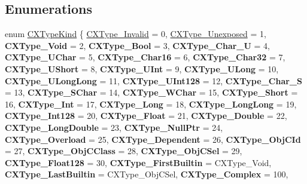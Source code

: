 \subsection*{Enumerations}
\begin{DoxyCompactItemize}
\item 
enum \hyperlink{group__CINDEX__TYPES_gaad39de597b13a18882c21860f92b095a}{C\+X\+Type\+Kind} \{ \newline
\hyperlink{group__CINDEX__TYPES_ggaad39de597b13a18882c21860f92b095aa242df2c1db62d571da24b4692781416a}{C\+X\+Type\+\_\+\+Invalid} = 0, 
\hyperlink{group__CINDEX__TYPES_ggaad39de597b13a18882c21860f92b095aa1aac64a0419dc4447e3bd63176c6a7d8}{C\+X\+Type\+\_\+\+Unexposed} = 1, 
{\bfseries C\+X\+Type\+\_\+\+Void} = 2, 
{\bfseries C\+X\+Type\+\_\+\+Bool} = 3, 
\newline
{\bfseries C\+X\+Type\+\_\+\+Char\+\_\+U} = 4, 
{\bfseries C\+X\+Type\+\_\+\+U\+Char} = 5, 
{\bfseries C\+X\+Type\+\_\+\+Char16} = 6, 
{\bfseries C\+X\+Type\+\_\+\+Char32} = 7, 
\newline
{\bfseries C\+X\+Type\+\_\+\+U\+Short} = 8, 
{\bfseries C\+X\+Type\+\_\+\+U\+Int} = 9, 
{\bfseries C\+X\+Type\+\_\+\+U\+Long} = 10, 
{\bfseries C\+X\+Type\+\_\+\+U\+Long\+Long} = 11, 
\newline
{\bfseries C\+X\+Type\+\_\+\+U\+Int128} = 12, 
{\bfseries C\+X\+Type\+\_\+\+Char\+\_\+S} = 13, 
{\bfseries C\+X\+Type\+\_\+\+S\+Char} = 14, 
{\bfseries C\+X\+Type\+\_\+\+W\+Char} = 15, 
\newline
{\bfseries C\+X\+Type\+\_\+\+Short} = 16, 
{\bfseries C\+X\+Type\+\_\+\+Int} = 17, 
{\bfseries C\+X\+Type\+\_\+\+Long} = 18, 
{\bfseries C\+X\+Type\+\_\+\+Long\+Long} = 19, 
\newline
{\bfseries C\+X\+Type\+\_\+\+Int128} = 20, 
{\bfseries C\+X\+Type\+\_\+\+Float} = 21, 
{\bfseries C\+X\+Type\+\_\+\+Double} = 22, 
{\bfseries C\+X\+Type\+\_\+\+Long\+Double} = 23, 
\newline
{\bfseries C\+X\+Type\+\_\+\+Null\+Ptr} = 24, 
{\bfseries C\+X\+Type\+\_\+\+Overload} = 25, 
{\bfseries C\+X\+Type\+\_\+\+Dependent} = 26, 
{\bfseries C\+X\+Type\+\_\+\+Obj\+C\+Id} = 27, 
\newline
{\bfseries C\+X\+Type\+\_\+\+Obj\+C\+Class} = 28, 
{\bfseries C\+X\+Type\+\_\+\+Obj\+C\+Sel} = 29, 
{\bfseries C\+X\+Type\+\_\+\+Float128} = 30, 
{\bfseries C\+X\+Type\+\_\+\+First\+Builtin} = C\+X\+Type\+\_\+\+Void, 
\newline
{\bfseries C\+X\+Type\+\_\+\+Last\+Builtin} = C\+X\+Type\+\_\+\+Obj\+C\+Sel, 
{\bfseries C\+X\+Type\+\_\+\+Complex} = 100, 

\end{DoxyCompactItemize}
